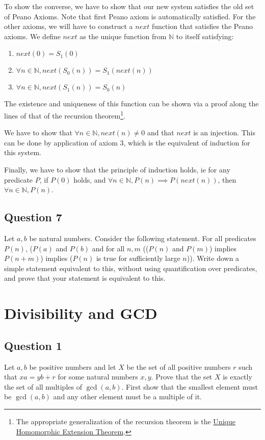 \documentclass[12pt]{report}
\begin{document}
To show the converse, we have to show that our new system satisfies the old set of Peano Axioms. Note that first Peano axiom is automatically satisfied. For the other axioms, we will have to construct a $next$ function that satisfies the Peano axioms. We define $next$ as the unique function from $\mathbb{N}$ to itself satisfying:
\begin{enumerate}
  \item $next(0) = S_{1}(0)$
  \item $\forall n \in \mathbb{N}, next(S_{0}(n)) = S_{1}(next(n))$
  \item $\forall n \in \mathbb{N}, next(S_{1}(n)) = S_{0}(n)$
\end{enumerate}

The existence and uniqueness of this function can be shown via a proof along the lines of that of the recursion theorem\footnote{The appropriate generalization of the recursion theorem is the \href{https://en.wikipedia.org/wiki/Unique_homomorphic_extension_theorem.}{Unique Homomorphic Extension Theorem}.}. 

We have to show that $\forall n \in \mathbb{N}, next(n) \neq 0$ and that $next$ is an injection. This can be done by application of axiom 3, which is the equivalent of induction for this system.

Finally, we have to show that the principle of induction holds, ie for any predicate $P$, if $P(0)$ holds, and $\forall n \in \mathbb{N}, P(n) \implies P(next(n))$, then $\forall n \in \mathbb{N}, P(n)$.
\section*{Question 7}
Let $a, b$ be natural numbers. Consider the following statement. For all predicates $P(n)$, ($P(a)$ and $P(b)$ and for all $n, m$ (($P(n)$ and $P(m)$) implies $P(n + m)$) implies ($P(n)$ is true for sufficiently large $n$)).  Write down a simple statement equivalent to this, without using quantification over predicates, and prove that your statement is equivalent to this.
\chapter{Divisibility and GCD}
\section*{Question 1}
Let $a, b$ be positive numbers and let $X$ be the set of all positive numbers $r$ such that $xa = yb + r$ for some natural numbers $x, y$. Prove that the set $X$ is exactly the set of all multiples of $\gcd(a, b)$. First show that the smallest element must be $\gcd(a, b)$ and any other element must be a multiple of it.
\end{document}
